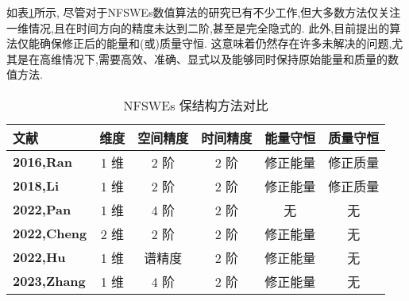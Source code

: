 如表\ref{tab:NFSWEs}所示, 尽管对于NFSWEs数值算法的研究已有不少工作,但大多数方法仅关注一维情况,且在时间方向的精度未达到二阶,甚至是完全隐式的.
此外,目前提出的算法仅能确保修正后的能量和(或)质量守恒.
这意味着仍然存在许多未解决的问题,尤其是在高维情况下,需要高效、准确、显式以及能够同时保持原始能量和质量的数值方法.
\begin{table}[htbp]
    \centering
    \small
    \caption{NFSWEs 保结构方法对比}
        \begin{tabular}{lccccc}
        \toprule
        \textcolor[rgb]{0,0,0}{\textbf{文献}} & \textcolor[rgb]{0,0,0}{\textbf{维度}} & \textcolor[rgb]{0,0,0}{\textbf{空间精度}} & \textcolor[rgb]{0,0,0}{\textbf{时间精度}} & \textcolor[rgb]{0,0,0}{\textbf{能量守恒}} & \textcolor[rgb]{0,0,0}{\textbf{质量守恒}} \\
        \midrule
        \textcolor[rgb]{0,0,0}{\textbf{\cite{ranLinearlyImplicitConservative2016}{2016,Ran}}} & 1 维   & 2 阶   & 2 阶   & 修正能量  & 修正质量 \\
        \midrule
        \textcolor[rgb]{0,0,0}{\textbf{\cite{liFastEnergyConserving2018}{2018,Li}}} & 1 维   & 2 阶   & 2 阶   & 修正能量  & 修正质量 \\
        \midrule
        \textcolor[rgb]{0,0,0}{\textbf{\cite{panFourthorderDifferenceScheme2022}{2022,Pan}}} & 1 维   & 4 阶   & 2 阶   & 无     & 无 \\
        \midrule
        \textcolor[rgb]{0,0,0}{\textbf{\cite{chengConvergenceEnergyconservingScheme2022}{2022,Cheng}}} & 2 维   & 2 阶   & 2 阶   & 修正能量  & 无 \\
        \midrule
        \textcolor[rgb]{0,0,0}{\textbf{\cite{huEfficientEnergyPreserving2022}{2022,Hu}}} & 1 维   & 谱精度   & 2 阶   & 修正能量  & 无 \\
        \midrule
        \textcolor[rgb]{0,0,0}{\textbf{\cite{zhangHighorderStructurepreservingDifference2023}{2023,Zhang}}} & 1 维   & 4 阶   & 2 阶   & 修正能量  & 无 \\
        \bottomrule
        \end{tabular}%
    \label{tab:NFSWEs}%
    \end{table}%
